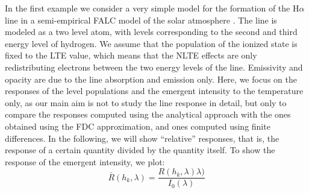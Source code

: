 \documentclass{aa}
\begin{document}
In the first example we consider a very simple model for the formation of the H$\alpha$ line in a semi-empirical FALC model of the solar atmosphere \citep{FALC}. The line is modeled as a two level atom, with levels corresponding to the second and third energy level of hydrogen. We assume that the population of the ionized state is fixed to the LTE value, which means that the NLTE effects are only redistributing electrons between the two energy levels of the line. Emissivity and opacity are due to the line absorption and emission only. Here, we focus on the responses of the level populations and the emergent intensity to the temperature only, as our main aim is not to study the line response in detail, but only to compare the responses computed using the analytical approach with the ones obtained using the FDC approximation, and ones computed using finite differences. In the following, we will show ``relative'' responses, that is, the response of a certain quantity divided by the quantity itself. To show the response of the emergent intensity, we plot:
\begin{equation}
 \bar{R}(h_k,\lambda) = \frac{R(h_k,\lambda)\lambda)}{I_0(\lambda)}
\end{equation}
\end{document}
